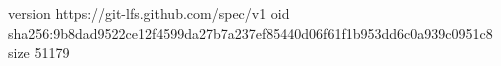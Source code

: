 version https://git-lfs.github.com/spec/v1
oid sha256:9b8dad9522ce12f4599da27b7a237ef85440d06f61f1b953dd6c0a939c0951c8
size 51179
